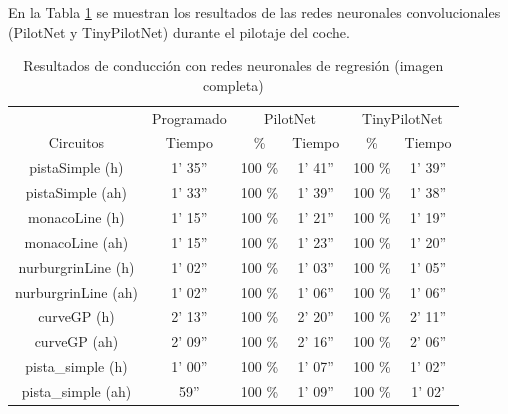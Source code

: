 En la Tabla \ref{resultados_regresion_completa} se muestran los resultados de las redes neuronales convolucionales (PilotNet y TinyPilotNet) durante el pilotaje del coche. \\

\begin{table}[H]
\centering
\caption{Resultados de conducción con redes neuronales de regresión (imagen completa)}
\label{resultados_regresion_completa}
\begin{tabular}{c|c|c|c|c|c|}
\cline{2-6}
                          & \multicolumn{1}{c|}{Programado} & \multicolumn{2}{c|}{PilotNet} & \multicolumn{2}{c|}{TinyPilotNet} \\ \cline{1-6} 
                        \multicolumn{1}{|c|}{Circuitos}    & Tiempo       & \%       & Tiempo       & \%        & Tiempo         \\ \hline
\multicolumn{1}{|c|}{pistaSimple (h)}    & 1' 35''           & 100 \%         & 1' 41''       &  100 \%        & 1' 39''               \\ \hline
\multicolumn{1}{|c|}{pistaSimple (ah)}     & 1' 33''           & 100 \%          & 1' 39''           & 100 \%        & 1' 38''      \\ \hline
\multicolumn{1}{|c|}{monacoLine (h)}      & 1' 15''           & 100 \%            & 1' 21''            & 100 \%         & 1' 19''                \\ \hline
\multicolumn{1}{|c|}{monacoLine (ah)}       & 1' 15''       &  100 \%      & 1' 23''         & 100 \%          & 1' 20''         \\ \hline
\multicolumn{1}{|c|}{nurburgrinLine (h)}      & 1' 02''       &  100 \%         & 1' 03''           & 100 \%        & 1' 05''       \\ \hline
\multicolumn{1}{|c|}{nurburgrinLine (ah)}       & 1' 02''     & 100 \%         & 1' 06''          & 100 \%     & 1' 06''            \\ \hline
\multicolumn{1}{|c|}{curveGP (h)}     & 2' 13''           & 100 \%         & 2' 20''            & 100 \%        & 2' 11''             \\ \hline
\multicolumn{1}{|c|}{curveGP (ah)}       & 2' 09''            & 100 \%         & 2' 16''        & 100 \%        & 2' 06''        \\ \hline
\multicolumn{1}{|c|}{pista\_simple (h)}       & 1' 00''           & 100 \%       & 1' 07''            & 100 \%         & 1' 02''        \\ \hline
\multicolumn{1}{|c|}{pista\_simple (ah)}     & 59''          & 100 \%       & 1' 09''         & 100 \%        & 1' 02'                 \\ \hline
\end{tabular}
\end{table}


